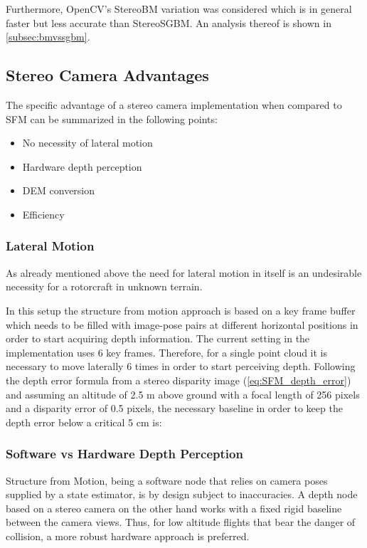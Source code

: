 Furthermore, OpenCV's StereoBM variation was considered which is in general faster but less accurate than StereoSGBM. An analysis thereof is shown in \cref{subsec:bmvssgbm}.


\subsection{Stereo Camera Advantages}

The specific advantage of a stereo camera implementation when compared to SFM can be summarized in the following points:

\begin{itemize}
    \item No necessity of lateral motion
    \item Hardware depth perception
    \item DEM conversion
    \item Efficiency
\end{itemize}

\subsubsection{Lateral Motion}

As already mentioned above the need for lateral motion in itself is an undesirable necessity for a rotorcraft in unknown terrain. 

In this setup the structure from motion approach is based on a key frame buffer which needs to be filled with image-pose pairs at different horizontal positions in order to start acquiring depth information. The current setting in the implementation \citet{SFM} uses 6 key frames. Therefore, for a single point cloud it is necessary to move laterally 6 times in order to start perceiving depth. Following the depth error formula from a stereo disparity image (\ref{eq:SFM_depth_error}) and assuming an altitude of 2.5 m above ground with a focal length of 256 pixels and a disparity error of 0.5 pixels, the necessary baseline in order to keep the depth error below a critical 5 cm is:

\subsubsection{Software vs Hardware Depth Perception}

Structure from Motion, being a software node that relies on camera poses supplied by a state estimator, is by design subject to inaccuracies. A depth node based on a stereo camera on the other hand works with a fixed rigid baseline between the camera views. Thus, for low altitude flights that bear the danger of collision, a more robust hardware approach is preferred.

